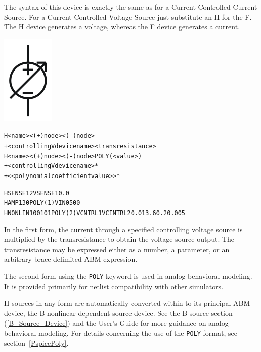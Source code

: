 


The syntax of this device is exactly the same as for a Current-Controlled
Current Source.  For a Current-Controlled Voltage Source just substitute an H
for the F. The H device generates a voltage, whereas the F device generates a
current.

\begin{Device}

\symbol
{\includegraphics{ccvsSymbol}}

\device
\begin{alltt}
H<name> <(+) node> <(-) node>
+ <controlling V device name> <transresistance>
H<name> <(+) node> <(-) node> POLY(<value>)
+ <controlling V device name>*
+ < <polynomial coefficient value> >*
\end{alltt}

\examples
\begin{alltt}
HSENSE 1 2 VSENSE 10.0
HAMP 13 0 POLY(1) VIN 0 500
HNONLIN 100 101 POLY(2) VCNTRL1 VCINTRL2 0.0 13.6 0.2 0.005
\end{alltt}

\comments

In the first form, the current through a specified controlling voltage
source is multiplied by the transresistance to obtain the
voltage-source output.  The transresistance may be expressed either as
a number, a parameter, or an arbitrary brace-delimited ABM expression.

The second form using the \texttt{POLY} keyword is used in analog
behavioral modeling.  It is provided primarily for netlist
compatibility with other simulators.

H sources in any form are automatically converted within \Xyce{} to
its principal ABM device, the B nonlinear dependent source device. See
the B-source section (\ref{B_Source_Device}) and the \Xyce{} User's
Guide for more guidance on analog behavioral modeling.  For details
concerning the use of the \texttt{POLY} format, see
section~\ref{PspicePoly}.


\end{Device}
